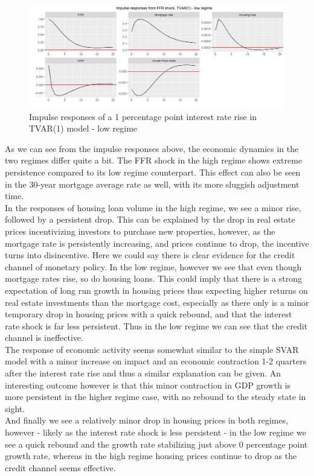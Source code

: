 \documentclass[12pt,a4paper]{article}
\begin{document}
 \begin{center}
	\begin{figure}[h!]
		\includegraphics[width = \textwidth]{tvarlow.png}
		\caption{Impulse responses of a 1 percentage point interest rate rise in TVAR(1) model - low regime}
	\end{figure}
\end{center}
As we can see from the impulse responses above, the economic dynamics in the two regimes differ quite a bit. The FFR shock in the high regime shows extreme persistence compared to its low regime counterpart. This effect can also be seen in the 30-year mortgage average rate as well, with its more sluggish adjustment time.\\
\noindent In the responses of housing loan volume in the high regime, we see a minor rise, followed by a persistent drop. This can be explained by the drop in real estate prices incentivizing investors to purchase new properties, however, as the mortgage rate is persistently increasing, and prices continue to drop, the incentive turns into disincentive. Here we could say there is clear evidence for the credit channel of monetary policy. In the low regime, however we see that even though mortgage rates rise, so do housing loans. This could imply that there is a strong expectation of long run growth in housing prices thus expecting higher returns on real estate investments than the mortgage cost, especially as there only is a minor temporary drop in housing prices with a quick rebound, and that the interest rate shock is far less persistent. Thus in the low regime we can see that the credit channel is ineffective.\\
\noindent The response of economic activity seems somewhat similar to the simple SVAR model with a minor increase on impact and an economic contraction 1-2 quarters after the interest rate rise and thus a similar explanation can be given. An interesting outcome however is that this minor contraction in GDP growth is more persistent in the higher regime case, with no rebound to the steady state in sight.\\ 
And finally we see a relatively minor drop in housing prices in both regimes, however - likely as the interest rate shock is less persistent - in the low regime we see a quick rebound and the growth rate stabilizing just above 0 percentage point growth rate, whereas in the high regime housing prices continue to drop as the credit channel seems effective.\\
\end{document}
